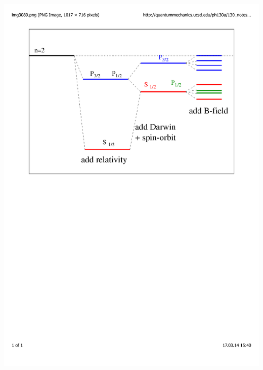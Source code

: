 \documentclass[mathserif,8pt]{beamer}
\begin{document}
\begin{frame}
\begin{columns}
\begin{column}{.50\textwidth}
	\includegraphics[viewport = 50 450 530 780, clip, scale=0.3]{figures/spin_orbit_splitting.pdf}\\
	\ \\
	\ \\
	\ \\

\end{column}
\end{columns}
\end{frame}
\end{document}
